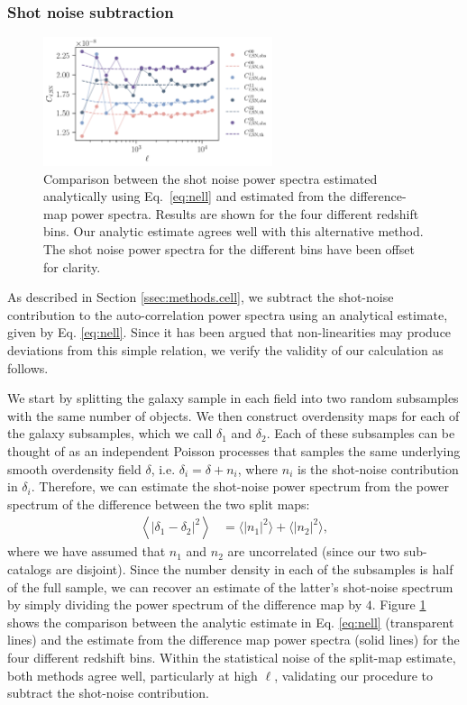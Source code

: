 \documentclass[a4paper,11pt]{article}
\begin{document}
    \subsubsection{Shot noise subtraction} \label{sssec:results.spectra.shotnoise}
      \begin{figure}
        \centering
        \includegraphics[width=0.6\textwidth]{figures/shotnoise_avg.pdf}
        \caption{Comparison between the shot noise power spectra estimated analytically using Eq.~\ref{eq:nell} and estimated from the difference-map power spectra. Results are shown for the four different redshift bins. Our analytic estimate agrees well with this alternative method. The shot noise power spectra for the different bins have been offset for clarity.}
        \label{fig:shotnoise_avg}
      \end{figure}
      As described in Section \ref{ssec:methods.cell}, we subtract the shot-noise contribution to the auto-correlation power spectra using an analytical estimate, given by Eq. \ref{eq:nell}. Since it has been argued \citep{2013PhRvD..88h3507B} that non-linearities may produce deviations from this simple relation, we verify the validity of our calculation as follows.
      
      We start by splitting the galaxy sample in each field into two random subsamples with the same number of objects.  We then construct overdensity maps for each of the galaxy subsamples, which we call $\delta_1$ and $\delta_2$.  Each of these subsamples can be thought of as an independent Poisson processes that samples the same underlying smooth overdensity field $\delta$, i.e. $\delta_i = \delta + n_i$, where $n_i$ is the shot-noise contribution in $\delta_i$. Therefore, we can estimate the shot-noise power spectrum from the power spectrum of the difference between the two split maps:
      \begin{align}
      \left\langle |\delta_1 - \delta_2|^2 \right\rangle & = \langle|n_1|^2\rangle + \langle|n_2|^2\rangle,
      \end{align}
      where we have assumed that $n_1$ and $n_2$ are uncorrelated (since our two sub-catalogs are disjoint). Since the number density in each of the subsamples is half of the full sample, we can recover an estimate of the latter's shot-noise spectrum by simply dividing the power spectrum of the difference map by $4$. Figure \ref{fig:shotnoise_avg} shows the comparison between the analytic estimate in Eq. \ref{eq:nell} (transparent lines) and the estimate from the difference map power spectra (solid lines) for the four different redshift bins. Within the statistical noise of the split-map estimate, both methods agree well, particularly at high $\ell$, validating our procedure to subtract the shot-noise contribution.
      
\end{document}
